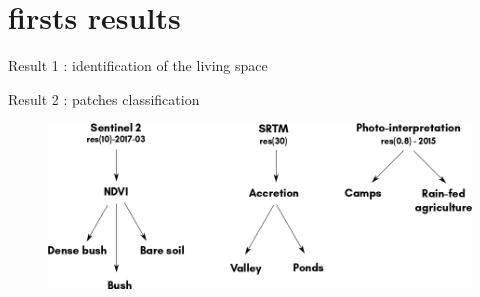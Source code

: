 \documentclass[newPxFont]{beamer}
\begin{document}

\section{firsts results}

\begin{frame}[c]{Result 1 : identification of the living space}
\vspace{-1cm}
\begin{figure}
\end{figure}
\end{frame}

\begin{frame}[c]{Result 2 : patches classification}
\vspace{-1cm}
\begin{figure}
  \centering
  \includegraphics[width = \textwidth]{img/process}
\end{figure}
\end{frame}
\end{document}
